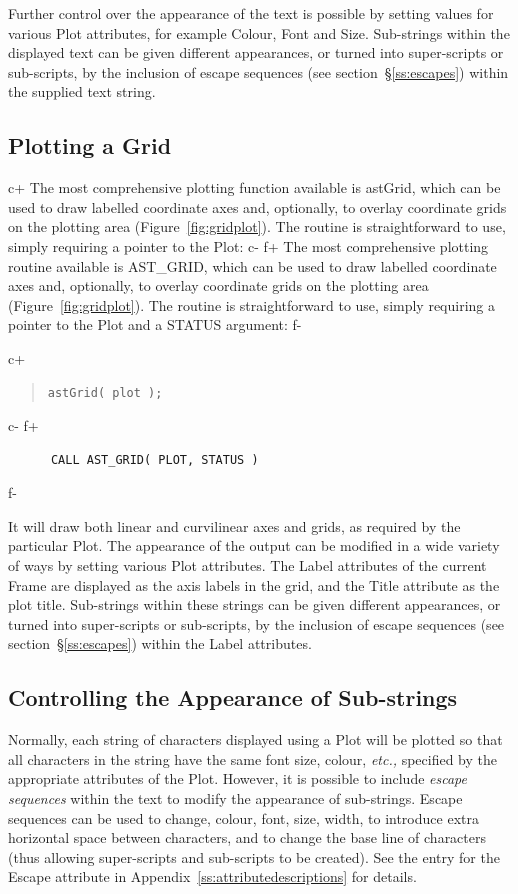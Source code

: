 \documentclass[twoside,11pt]{article}
\newcommand{\appref}[1]{Appendix~\ref{#1}}
\newcommand{\secref}[1]{\S\ref{#1}}
\newcommand{\appref}[1]{\ref{#1}}
\newcommand{\secref}[1]{\ref{#1}}
\begin{document}
Further control over the appearance of the text is possible by setting
values for various Plot attributes, for example Colour, Font and Size.
Sub-strings within the displayed text can be given different appearances,
or turned into super-scripts or sub-scripts, by the inclusion of escape
sequences (see section~\secref{ss:escapes}) within the supplied text string.

\subsection{\label{ss:plottingagrid}Plotting a Grid}

c+
The most comprehensive plotting function available is astGrid, which
can be used to draw labelled coordinate axes and, optionally, to
overlay coordinate grids on the plotting area
(Figure~\ref{fig:gridplot}). The routine is straightforward to use,
simply requiring a pointer to the Plot:
c-
f+
The most comprehensive plotting routine available is AST\_GRID, which
can be used to draw labelled coordinate axes and, optionally, to
overlay coordinate grids on the plotting area
(Figure~\ref{fig:gridplot}). The routine is straightforward to use,
simply requiring a pointer to the Plot and a STATUS argument:
f-

c+
\begin{quote}
\small
\begin{verbatim}
astGrid( plot );
\end{verbatim}
\normalsize
\end{quote}
c-
f+
\small
\begin{verbatim}
      CALL AST_GRID( PLOT, STATUS )
\end{verbatim}
\normalsize
f-

It will draw both linear and curvilinear axes and grids, as required
by the particular Plot. The appearance of the output can be modified
in a wide variety of ways by setting various Plot attributes.
The Label attributes of the current Frame are displayed as the axis
labels in the grid, and the Title attribute as the plot title. Sub-strings
within these strings can be given different appearances, or turned into
super-scripts or sub-scripts, by the inclusion of escape sequences (see
section~\secref{ss:escapes}) within the Label attributes.

\subsection{\label{ss:escapes}Controlling the Appearance of Sub-strings}
Normally, each string of characters displayed using a Plot will be
plotted so that all characters in the string have the same font size,
colour, {\em{etc.,}} specified by the appropriate attributes of the
Plot. However, it is possible to include \emph{escape sequences} within
the text to modify the appearance of sub-strings. Escape sequences can be
used to change, colour, font, size, width, to introduce extra horizontal
space between characters, and to change the base line of characters (thus
allowing super-scripts and sub-scripts to be created). See the entry for
the Escape attribute in \appref{ss:attributedescriptions} for details.
\end{document}
